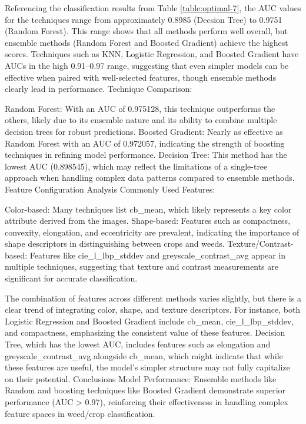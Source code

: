 \documentclass[letterpaper]{report}
\begin{document}
Referencing the classification results from Table \ref{table:optimal-7}, the AUC values for the techniques range from approximately 0.8985 (Decsion Tree) to 0.9751 (Random Forest). This range shows that all methods perform well overall, but ensemble methods (Random Forest and Boosted Gradient) achieve the highest scores.
Techniques such as KNN, Logistic Regression, and Boosted Gradient have AUCs in the high 0.91–0.97 range, suggesting that even simpler models can be effective when paired with well-selected features, though ensemble methods clearly lead in performance.
Technique Comparison:

Random Forest: With an AUC of 0.975128, this technique outperforms the others, likely due to its ensemble nature and its ability to combine multiple decision trees for robust predictions.
Boosted Gradient: Nearly as effective as Random Forest with an AUC of 0.972057, indicating the strength of boosting techniques in refining model performance.
Decision Tree: This method has the lowest AUC (0.898545), which may reflect the limitations of a single-tree approach when handling complex data patterns compared to ensemble methods.
Feature Configuration Analysis
Commonly Used Features:

Color-based: Many techniques list cb\_mean, which likely represents a key color attribute derived from the images.
Shape-based: Features such as compactness, convexity, elongation, and eccentricity are prevalent, indicating the importance of shape descriptors in distinguishing between crops and weeds.
Texture/Contrast-based: Features like cie\_l\_lbp\_stddev and greyscale\_contrast\_avg appear in multiple techniques, suggesting that texture and contrast measurements are significant for accurate classification.

The combination of features across different methods varies slightly, but there is a clear trend of integrating color, shape, and texture descriptors. For instance, both Logistic Regression and Boosted Gradient include cb\_mean, cie\_l\_lbp\_stddev, and compactness, emphasizing the consistent value of these features.
Decision Tree, which has the lowest AUC, includes features such as elongation and greyscale\_contrast\_avg alongside cb\_mean, which might indicate that while these features are useful, the model’s simpler structure may not fully capitalize on their potential.
Conclusions
Model Performance:
Ensemble methods like Random  and boosting techniques like Boosted Gradient demonstrate superior performance (AUC > 0.97), reinforcing their effectiveness in handling complex feature spaces in weed/crop classification.
\end{document}
